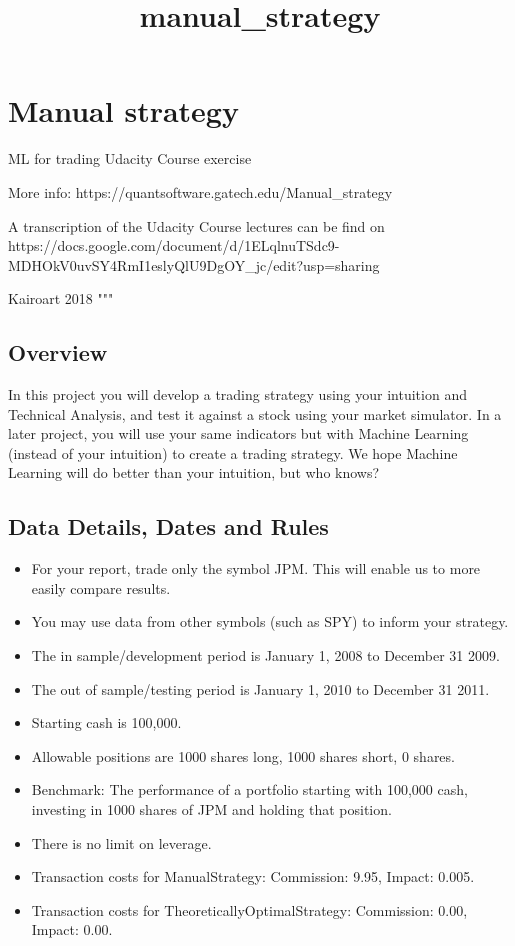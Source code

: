 \documentclass[11pt]{article}
\title{manual\_strategy}
\providecommand{\tightlist}{%
      \setlength{\itemsep}{0pt}\setlength{\parskip}{0pt}}
\begin{document}
    
    
    \maketitle
    
    

    
    \section{Manual strategy}\label{manual-strategy}

ML for trading Udacity Course exercise

More info: https://quantsoftware.gatech.edu/Manual\_strategy

A transcription of the Udacity Course lectures can be find on
https://docs.google.com/document/d/1ELqlnuTSdc9-MDHOkV0uvSY4RmI1eslyQlU9DgOY\_jc/edit?usp=sharing

Kairoart 2018 """

    \subsection{Overview}\label{overview}

In this project you will develop a trading strategy using your intuition
and Technical Analysis, and test it against a stock using your market
simulator. In a later project, you will use your same indicators but
with Machine Learning (instead of your intuition) to create a trading
strategy. We hope Machine Learning will do better than your intuition,
but who knows?

    \subsection{Data Details, Dates and
Rules}\label{data-details-dates-and-rules}

\begin{itemize}
\tightlist
\item
  For your report, trade only the symbol JPM. This will enable us to
  more easily compare results.
\item
  You may use data from other symbols (such as SPY) to inform your
  strategy.
\item
  The in sample/development period is January 1, 2008 to December 31
  2009.
\item
  The out of sample/testing period is January 1, 2010 to December 31
  2011.
\item
  Starting cash is 100,000.
\item
  Allowable positions are 1000 shares long, 1000 shares short, 0 shares.
\item
  Benchmark: The performance of a portfolio starting with 100,000 cash,
  investing in 1000 shares of JPM and holding that position.
\item
  There is no limit on leverage.
\item
  Transaction costs for ManualStrategy: Commission: 9.95, Impact: 0.005.
\item
  Transaction costs for TheoreticallyOptimalStrategy: Commission: 0.00,
  Impact: 0.00.
\end{itemize}
\end{document}
